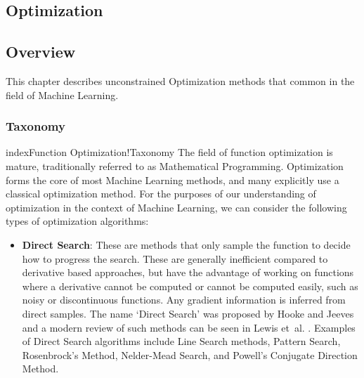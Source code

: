 

\renewcommand{\bibsection}{\subsection{\bibname}}
\begin{bibunit}

\chapter{Optimization}
\label{ch:optimization}

\section{Overview}
This chapter describes unconstrained Optimization methods that common in the field of Machine Learning.

\subsection{Taxonomy}
index{Function Optimization!Taxonomy}
The field of function optimization is mature, traditionally referred to as Mathematical Programming. Optimization forms the core of most Machine Learning methods, and many explicitly use a classical optimization method. For the purposes of our understanding of optimization in the context of Machine Learning, we can consider the following types of optimization algorithms:

\begin{itemize}
	\item \textbf{Direct Search}: These are methods that only sample the function to decide how to progress the search. These are generally inefficient compared to derivative based approaches, but have the advantage of working on functions where a derivative cannot be computed or cannot be computed easily, such as noisy or discontinuous functions. Any gradient information is inferred from direct samples. The name `Direct Search' was proposed by Hooke and Jeeves \cite{Hooke1961} and a modern review of such methods can be seen in Lewis et~al. \cite{Lewis2000}. Examples of Direct Search algorithms include Line Search methods, Pattern Search, Rosenbrock's Method, Nelder-Mead Search, and Powell's Conjugate Direction Method.


\end{itemize}
\end{bibunit}
